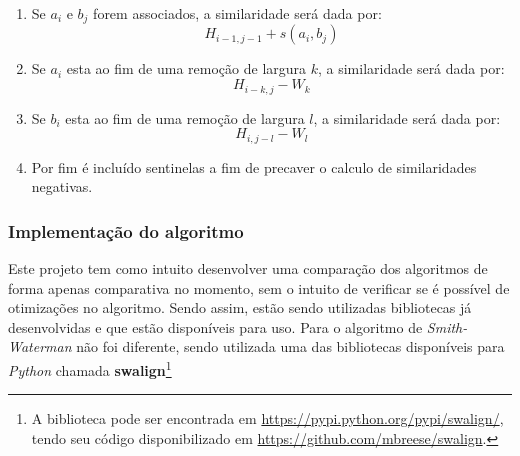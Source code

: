 \begin{enumerate}
	\item Se $a_i$ e $b_j$ forem associados, a similaridade será dada por:
	\begin{equation*}
		H_{i-1,j-1} + s(a_i,b_j)
	\end{equation*}
	\item Se $a_i$ esta ao fim de uma remoção de largura $k$, a similaridade será dada por:
	\begin{equation*}
		H_{i-k,j} - W_k
	\end{equation*}
	\item Se $b_i$ esta ao fim de uma remoção de largura $l$, a similaridade será dada por:
	\begin{equation*}
		H_{i,j-l} - W_l
	\end{equation*}
	\item Por fim é incluído sentinelas a fim de precaver o calculo de similaridades negativas.
\end{enumerate}

\subsubsection{Implementação do algoritmo} %
\label{sub:implementa_o_do_algoritmo}

Este projeto tem como intuito desenvolver uma comparação dos algoritmos de forma apenas comparativa no momento, sem o intuito de verificar se é possível de otimizações no algoritmo. Sendo assim, estão sendo utilizadas bibliotecas já desenvolvidas e que estão  disponíveis para uso. Para o algoritmo de \textit{Smith-Waterman} não foi diferente, sendo utilizada uma das bibliotecas disponíveis para \textit{Python} chamada \textbf{swalign}\footnote{A biblioteca pode ser encontrada em \url{https://pypi.python.org/pypi/swalign/}, tendo seu código disponibilizado em \url{https://github.com/mbreese/swalign}.}


